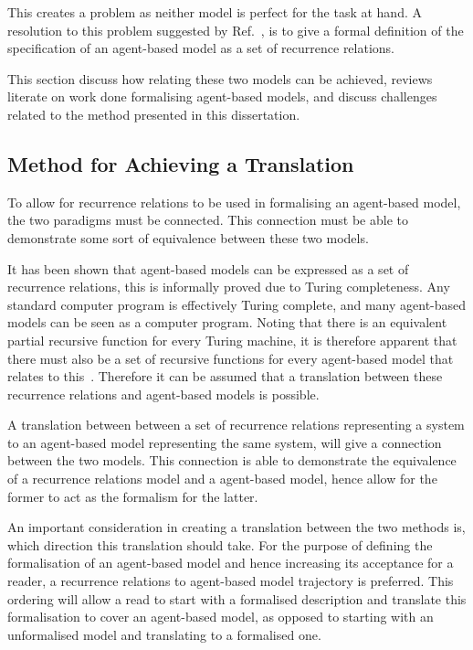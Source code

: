 \documentclass{article}
\begin{document}
This creates a problem as neither model is perfect for the task at hand. A resolution to this problem suggested by Ref.~\cite{econmistsnoabm}, is to give a formal definition of the specification of an agent-based model as a set of recurrence relations. 

This section discuss how relating these two models can be achieved, reviews literate on work done formalising agent-based models, and discuss challenges related to the method presented in this dissertation.  


\subsection{Method for Achieving a Translation}
To allow for recurrence relations to be used in formalising an agent-based model, the two paradigms must be connected. This connection must be able to demonstrate some sort of equivalence between these two models. 

It has been shown that agent-based models can be expressed as a set of recurrence relations, this is informally proved due to Turing completeness. Any standard computer program is effectively Turing complete, and many agent-based models can be seen as a computer program. Noting that there is an equivalent partial recursive function for every Turing machine, it is therefore apparent that there must also be a set of recursive functions for every agent-based model that relates to this~\cite{gabm3}. Therefore it can be assumed that a translation between these recurrence relations and agent-based models is possible.

A translation between between a set of recurrence relations representing a system to an agent-based model representing the same system, will give a connection between the two models. This connection is able to demonstrate the equivalence of a recurrence relations model and a agent-based model, hence allow for the former to act as the formalism for the latter.   

An important consideration in creating a translation between the two methods is, which direction this translation should take. For the purpose of defining the formalisation of an agent-based model and hence increasing its acceptance for a reader, a recurrence relations to agent-based model trajectory is preferred. This ordering will allow a read to start with a formalised description and translate this formalisation to cover an agent-based model, as opposed to starting with an unformalised model and translating to a formalised one.     
\end{document}
